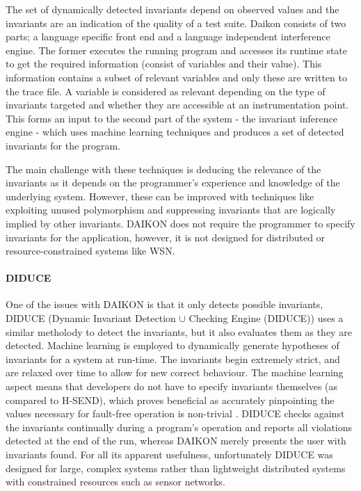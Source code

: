 The set of dynamically detected invariants depend on observed values and the invariants are an indication of the quality of a test suite. Daikon consists of two parts; a language specific front end and a language independent interference engine. The former executes the running program and accesses its runtime state to get the required information (consist of variables and their value). This information contains a subset of relevant variables and only these are written to the trace file. A variable is considered as relevant depending on the type of invariants targeted and whether they are accessible at an instrumentation point. This forms an input to the second part of the system - the invariant inference engine - which uses machine learning techniques and produces a set of detected invariants for the program.

The main challenge with these techniques is deducing the relevance of the invariants as it depends on the programmer's experience and knowledge of the underlying system. However, these can be improved with techniques like exploiting unused polymorphism and suppressing invariants that are logically implied by other invariants. DAIKON does not require the programmer to specify invariants for the application, however, it is not designed for distributed or resource-constrained systems like WSN.

\paragraph{DIDUCE} One of the issues with DAIKON is that it only detects possible invariants, DIDUCE \cite{diduce} (Dynamic Invariant Detection $\cup$ Checking Engine (DIDUCE)) uses a similar metholody to detect the invariants, but it also evaluates them as they are detected. Machine learning is employed to dynamically generate hypotheses of invariants for a system at run-time. The invariants begin extremely strict, and are relaxed over time to allow for new correct behaviour. The machine learning aspect means that developers do not have to specify invariants themselves (as compared to H-SEND), which proves beneficial as accurately pinpointing the values necessary for fault-free operation is non-trivial \cite{?}. DIDUCE checks against the invariants continually during a program's operation and reports all violations detected at the end of the run, whereas DAIKON merely presents the user with invariants found. For all its apparent usefulness, unfortunately DIDUCE was designed for large, complex systems rather than lightweight distributed systems with constrained resources such as sensor networks.

